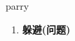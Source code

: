 
\begin{frame}
{\huge parry}
\begin{center}
\begin{enumerate}\Large
  \item \textbf{躲避(问题)}
\end{enumerate}
\end{center}
\end{frame}
